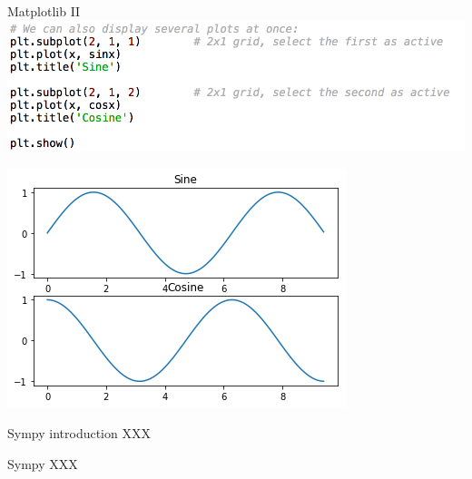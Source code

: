 \documentclass[11pt,unknownkeysallowed,usenames,dvipsnames]{beamer}
\begin{document}
\begin{frame}{Matplotlib II}
	\includegraphics[width=0.9\linewidth]{code-matplotlib2}
	
	\centering    \includegraphics[width=0.4\linewidth]{plot2}
\end{frame}


\begin{frame}{Sympy introduction}
    XXX
\end{frame}

\begin{frame}{Sympy}
	XXX
\end{frame}
\end{document}
